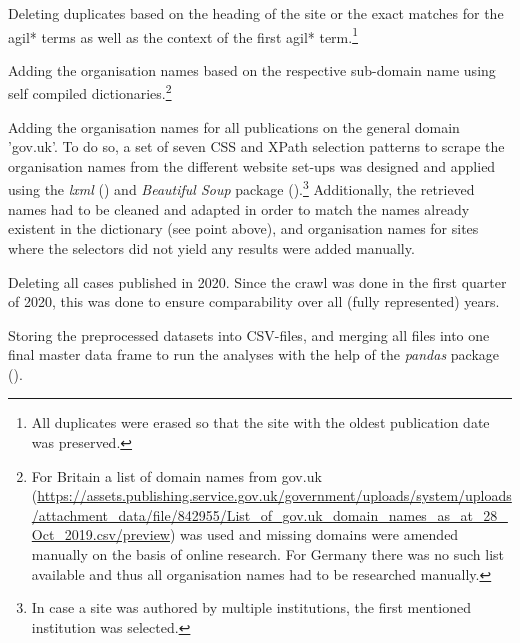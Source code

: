 \begin{compactitem}
\item Deleting duplicates based on the heading of the site or the exact matches for the agil* terms as well as the context of the first agil* term.\footnote{All duplicates were erased so that the site with the oldest publication date was preserved.}
\item Adding the organisation names based on the respective sub-domain name using self compiled dictionaries.\footnote{For Britain a list of domain names from gov.uk (\url{https://assets.publishing.service.gov.uk/government/uploads/system/uploads/attachment_data/file/842955/List_of_gov.uk_domain_names_as_at_28_Oct_2019.csv/preview}) was used and missing domains were amended manually on the basis of online research. For Germany there was no such list available and thus all organisation names had to be researched manually.} 
\item Adding the organisation names for all publications on the general domain 'gov.uk'. To do so, a set of seven CSS and XPath selection patterns to scrape the organisation names from the different website set-ups was designed and applied using the \textit{lxml} (\cite{Faassen2006}) and \textit{Beautiful Soup} package (\cite{Richardson2007}).\footnote{In case a site was authored by multiple institutions, the first mentioned institution was selected.} Additionally, the retrieved names had to be cleaned and adapted in order to match the names already existent in the dictionary (see point above), and organisation names for sites where the selectors did not yield any results were added manually. 
\item Deleting all cases published in 2020. Since the crawl was done in the first quarter of 2020, this was done to ensure comparability over all (fully represented) years.
\item Storing the preprocessed datasets into CSV-files, and merging all files into one final master data frame to run the analyses with the help of the \textit{pandas} package (\cite{McKinney2010}). 
\end{compactitem}

